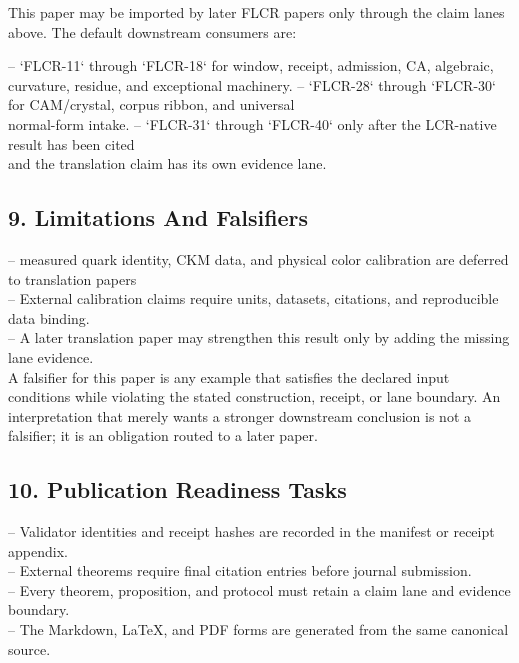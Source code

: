 \documentclass[11pt]{article}
\begin{document}
This paper may be imported by later FLCR papers only through the claim lanes
above. The default downstream consumers are:

\noindent{}-- `FLCR-11` through `FLCR-18` for window, receipt, admission, CA, algebraic,\\
  curvature, residue, and exceptional machinery.
\noindent{}-- `FLCR-28` through `FLCR-30` for CAM/crystal, corpus ribbon, and universal\\
  normal-form intake.
\noindent{}-- `FLCR-31` through `FLCR-40` only after the LCR-native result has been cited\\
  and the translation claim has its own evidence lane.

\subsection*{9. Limitations And Falsifiers}

\noindent{}-- measured quark identity, CKM data, and physical color calibration are deferred to translation papers\\
\noindent{}-- External calibration claims require units, datasets, citations, and reproducible data binding.\\
\noindent{}-- A later translation paper may strengthen this result only by adding the missing lane evidence.\\

A falsifier for this paper is any example that satisfies the declared input
conditions while violating the stated construction, receipt, or lane boundary.
An interpretation that merely wants a stronger downstream conclusion is not a
falsifier; it is an obligation routed to a later paper.

\subsection*{10. Publication Readiness Tasks}

\noindent{}-- Validator identities and receipt hashes are recorded in the manifest or receipt appendix.\\
\noindent{}-- External theorems require final citation entries before journal submission.\\
\noindent{}-- Every theorem, proposition, and protocol must retain a claim lane and evidence boundary.\\
\noindent{}-- The Markdown, LaTeX, and PDF forms are generated from the same canonical source.\\
\end{document}
